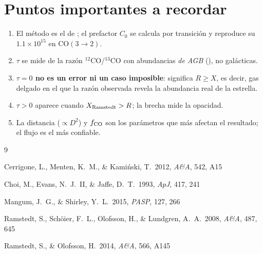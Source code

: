 \documentclass[12pt, a4paper]{article}
\begin{document}
\section{Puntos importantes a recordar}

\begin{enumerate}
    \item El método es el de \citet{cerrigone2012}; el prefactor $C_0$ se calcula por
    transición y reproduce su $1.1\times10^{15}$ en CO$(3\to2)$.
    \item $\tau$ se mide de la razón $^{12}$CO/$^{13}$CO con abundancias \emph{de AGB}
    (\citealp{ramstedt2014}), no galácticas.
    \item \textbf{$\tau=0$ no es un error ni un caso imposible}: significa $R\geq X$, es decir,
    gas delgado en el que la razón observada revela la abundancia real de la estrella.
    \item $\tau>0$ aparece cuando $X_{\rm Ramstedt} > R$; la brecha mide la opacidad.
    \item La distancia ($\propto D^2$) y $f_{\rm CO}$ son los parámetros que más afectan el
    resultado; el flujo es el más confiable.
\end{enumerate}

\begin{thebibliography}{9}

Cerrigone, L., Menten, K.~M., \& Kami\'nski, T.\
2012, \textit{A\&A}, 542, A15

Choi, M., Evans, N.~J.~II, \& Jaffe, D.~T.\
1993, \textit{ApJ}, 417, 241

Mangum, J.~G., \& Shirley, Y.~L.\
2015, \textit{PASP}, 127, 266

Ramstedt, S., Sch\"oier, F.~L., Olofsson, H., \& Lundgren, A.~A.\
2008, \textit{A\&A}, 487, 645

Ramstedt, S., \& Olofsson, H.\
2014, \textit{A\&A}, 566, A145

\end{thebibliography}
\end{document}
